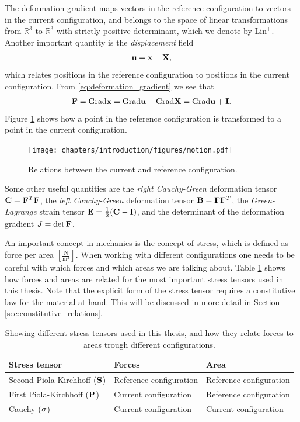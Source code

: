 The deformation gradient maps vectors in the reference configuration to
vectors in the current configuration, and belongs to the space of
linear transformations from $\mathbb{R}^3$ to $\mathbb{R}^3$ with
strictly positive determinant, which we denote by
$\mathrm{Lin}^+$. Another important quantity is the
\emph{displacement} field  
\begin{align}
  \mathbf{u} = \mathbf{x}-\mathbf{X}, 
  \label{eq:displacement}
\end{align}
which relates positions in the reference configuration to positions
in the current configuration. From \eqref{eq:deformation_gradient} we
see that
\begin{align}
  \mathbf{F} = \mathrm{Grad} \mathbf{x} = \mathrm{Grad} \mathbf{u} + \mathrm{Grad} \mathbf{X} = \mathrm{Grad} \mathbf{u} + \mathbf{I}.
\end{align}
Figure \ref{fig:motion} shows how a point in the reference
configuration is transformed to a point in the current configuration. 
\begin{figure}[htbp]
  \centering
    \texttt{[image: chapters/introduction/figures/motion.pdf]}
\caption{Relations between the current and reference configuration.}
\label{fig:motion}
\end{figure}
Some other useful quantities are the \emph{right Cauchy-Green} deformation
tensor $\mathbf{C} = \mathbf{F}^T\mathbf{F}$, the \emph{left Cauchy-Green} deformation tensor
$\mathbf{B} = \mathbf{F}\mathbf{F}^T$, the \emph{Green-Lagrange} strain tensor
$\mathbf{E} = \frac{1}{2}(\mathbf{C} - \mathbf{I})$, and the determinant of the
deformation gradient $J = \det \mathbf{F}$.

An important concept in mechanics is the concept of stress, which is
defined as force per area
$\left[\frac{\mathrm{N}}{\mathrm{m}^2}\right]$. When working with
different configurations one needs to be careful with which forces and
which areas we are talking about. Table \ref{tab:stress_tensor}
shows how forces and areas are related for the most important stress
tensors used in this thesis. Note that the explicit form of the stress
tensor requires a constitutive law for the material at hand. This will
be discussed in more detail in Section \ref{sec:constitutive_relations}.

\begin{table}[h]
  \centering
  \begin{tabular}{lll}
    \toprule
    Stress tensor & Forces & Area \\
    \midrule
    Second Piola-Kirchhoff ($\mathbf{S}$) & Reference configuration & Reference configuration \\
    First Piola-Kirchhoff ($\mathbf{P}$) & Current configuration  &  Reference configuration \\
    Cauchy ($\mathbf{\sigma}$) &  Current configuration & Current configuration  \\
    \bottomrule
  \end{tabular}
  \caption{\label{tab:stress_tensor}Showing different stress tensors
    used in this thesis, and how
    they relate forces to areas trough different configurations.}
\end{table}


